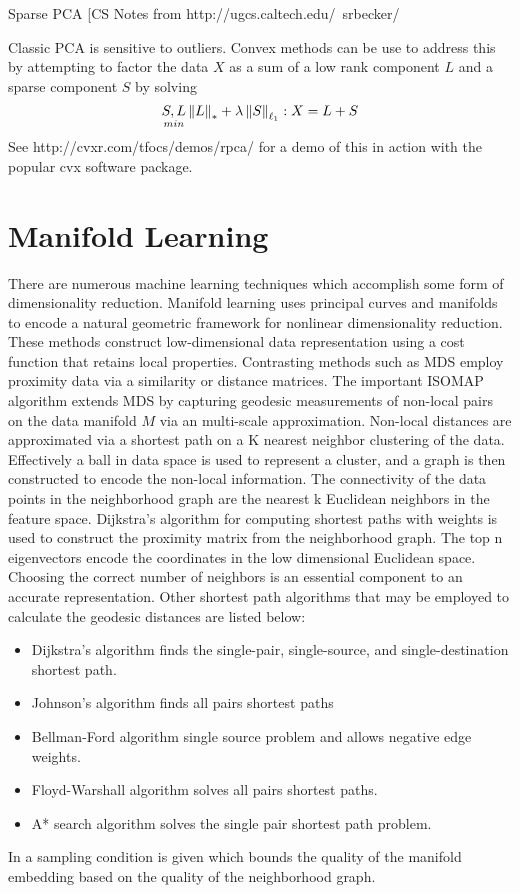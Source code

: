 Sparse PCA
[CS Notes from http://ugcs.caltech.edu/~srbecker/

Classic PCA is sensitive to outliers.  Convex methods can be use to address this by attempting to factor the data $X$ as a sum of a low rank component $L$ and a sparse component $S$ by solving
\begin{equation*}
\underset{min}{S,L} \left\Vert L\right\Vert_* + \lambda \left\Vert S\right\Vert_{\ell_1}  : X=L+S
\end{equation*}
See http://cvxr.com/tfocs/demos/rpca/ for a demo of this in action with the popular cvx software package.


\section{Manifold Learning}
There are numerous machine learning techniques which accomplish some form of dimensionality reduction.
Manifold learning uses principal curves and manifolds to encode a natural geometric framework for nonlinear dimensionality reduction.  These methods construct low-dimensional data representation using a cost function that retains local properties.
Contrasting methods such as MDS employ proximity data via a similarity or distance matrices.  The important ISOMAP \cite{MDS_ISOMAP}algorithm extends MDS by capturing geodesic measurements of non-local pairs on the data manifold $M$ via an multi-scale approximation.  Non-local distances are approximated via a shortest path on a K nearest neighbor clustering of the data.  Effectively a ball in data space is used to represent a cluster, and a graph is then constructed to encode the non-local information.  The connectivity of the data points in the neighborhood graph are the nearest k Euclidean neighbors in the feature space.  Dijkstra's algorithm for computing shortest paths with weights is used to construct the proximity matrix from the neighborhood graph.  The top n eigenvectors encode the coordinates in the low dimensional Euclidean space.  Choosing the correct number of neighbors is an essential component to an accurate representation.
Other shortest path algorithms that may be employed to calculate the geodesic distances are listed below:
\begin{itemize}
  \item Dijkstra's algorithm finds the single-pair, single-source, and single-destination shortest path.
  \item Johnson's algorithm finds all pairs shortest paths
  \item Bellman-Ford algorithm single source problem and allows negative edge weights.
  \item Floyd-Warshall algorithm solves all pairs shortest paths.
  \item A* search algorithm solves the single pair shortest path problem.
\end{itemize}
In \cite{MDSBernstein00graphapproximations} a sampling condition is given which bounds the quality of the manifold embedding based on the quality of the neighborhood graph.


